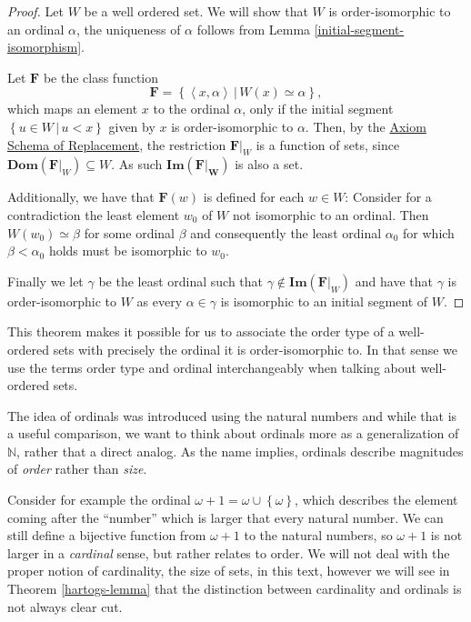 \documentclass[../../main.tex]{subfiles}
\begin{document}
\begin{proof}
    Let $W$ be a well ordered set.
    We will show that $W$ is order-isomorphic to an ordinal $\alpha$, the uniqueness of $\alpha$ follows from Lemma \ref{initial-segment-isomorphism}.

    Let $\mathbf{F}$ be the class function
    $$\mathbf{F} = \left\{\left<x, \alpha\right> \,\vert\, W(x) \simeq \alpha\right\},$$
    which maps an element $x$ to the ordinal $\alpha$, only if the initial segment $\left\{u \in W \,\vert\, u < x\right\}$ given by $x$ is order-isomorphic to $\alpha$.
    Then, by the \hyperref[ZF8]{Axiom Schema of Replacement}, the restriction $\mathbf{F}\vert_W$ is a function of sets, since $\mathbf{Dom}(\mathbf{F}\vert_W) \subseteq W$.
    As such $\mathbf{Im}(\mathbf{F\vert_W})$ is also a set.

    Additionally, we have that $\mathbf{F}(w)$ is defined for each $w \in W$:
    Consider for a contradiction the least element $w_0$ of $W$ not isomorphic to an ordinal.
    Then $W(w_0) \simeq \beta$ for some ordinal $\beta$ and consequently the least ordinal $\alpha_0$ for which $\beta < \alpha_0$ holds must be isomorphic to $w_0$.

    Finally we let $\gamma$ be the least ordinal such that $\gamma \not\in \textbf{Im}(\mathbf{F}\vert_W)$ and have that $\gamma$ is order-isomorphic to $W$ 
    as every $\alpha \in \gamma$ is isomorphic to an initial segment of $W$.
\end{proof}

This theorem makes it possible for us to associate the order type of a well-ordered sets with precisely the ordinal it is order-isomorphic to.
In that sense we use the terms order type and ordinal interchangeably when talking about well-ordered sets.

The idea of ordinals was introduced using the natural numbers and while that is a useful comparison, 
we want to think about ordinals more as a generalization of $\mathbb{N}$, rather that a direct analog.
As the name implies, ordinals describe magnitudes of \textit{order} rather than \textit{size}.

Consider for example the ordinal $\omega + 1 = \omega \cup \left\{\omega\right\}$, which describes the element coming after the ``number'' which is larger that every natural number.
We can still define a bijective function from $\omega + 1$ to the natural numbers, so $\omega + 1$ is not larger in a \textit{cardinal} sense, but rather relates to order.
We will not deal with the proper notion of cardinality, the size of sets, in this text, 
however we will see in Theorem \ref{hartogs-lemma} that the distinction between cardinality and ordinals is not always clear cut.
\end{document}
